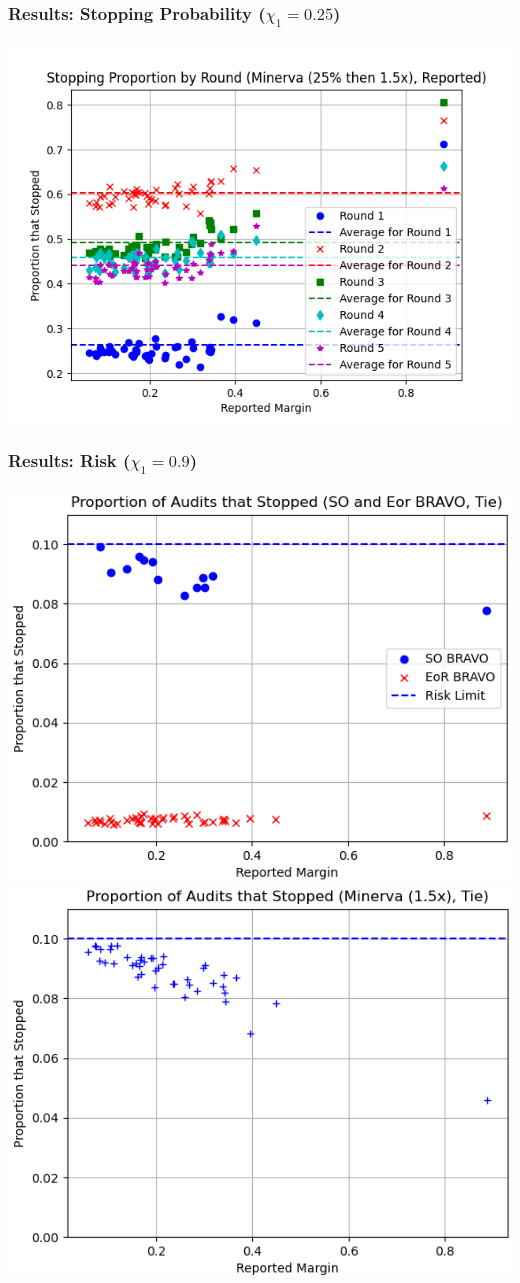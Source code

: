\documentclass{beamer}
\begin{document}
\begin{frame}
\frametitle{Results: Stopping Probability ($\chi_1=0.25$)}

\includegraphics[width=1\textwidth]{minerva25percthen1p5_sprob.png}
\end{frame}


\begin{frame}
\frametitle{Results: Risk ($\chi_1=0.9$)}


\centering
\includegraphics[width=.5\textwidth]{bravo_risks.png}
\pause 
\includegraphics[width=.5\textwidth]{riskminerva1p5_10t4.png}

\end{frame}
\end{document}
